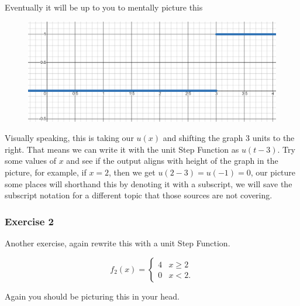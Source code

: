 \documentclass[12pt]{article}
\begin{document}
Eventually it will be up to you to mentally picture this

\begin{figure}[!htbp]
\centering
\includegraphics[scale=.4]{step1.PNG}
\label{fig:hsf1}
\end{figure}

Visually speaking, this is taking our $u(x)$ and shifting the graph 3 units to the right. That means we can write it with the unit Step Function as $u(t-3)$. Try some values of $x$ and see if the output aligns with height of the graph in the picture, for example, if $x=2$, then we get $u(2-3)=u(-1)=0$, our picture some places will shorthand this by denoting it with a subscript, we will save the subscript notation for a different topic that those sources are not covering.

\subsubsection{Exercise 2}

Another exercise, again rewrite this with a unit Step Function. 

\begin{equation*}
    f_2(x)=\left\{
        \begin{array}{rl}
            4 &  x \geq 2  \\
            0 &  x < 2.
        \end{array}
    \right.
\end{equation*}

Again you should be picturing this in your head. 

\pagebreak
\end{document}
